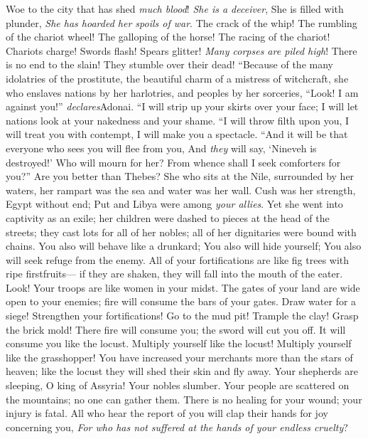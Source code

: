 \begin{biblechapter} %
 Woe to the city that has shed \textit{much blood}! 
\textit{She is a deceiver}, 
She is filled with plunder, 
\textit{She has hoarded her spoils of war}.
\verse The crack of the whip! 
The rumbling of the chariot wheel! 
The galloping of the horse! 
The racing of the chariot!
\verse Chariots charge! 
Swords flash! 
Spears glitter! 
\textit{Many corpses are piled high}! 
There is no end to the slain! 
They stumble over their dead!
 “Because of the many idolatries of the prostitute, 
the beautiful charm of a mistress of witchcraft, 
she who enslaves nations by her harlotries, 
and peoples by her sorceries,
\verse “Look! I am against you!” \textit{declares}Adonai. 
“I will strip up your skirts over your face; 
I will let nations look at your nakedness and your shame.
\verse “I will throw filth upon you, 
I will treat you with contempt, 
I will make you a spectacle.
\verse “And it will be that everyone who sees you will flee from you, 
And \textit{they} will say, ‘Nineveh is destroyed!’ 
Who will mourn for her? 
From whence shall I seek comforters for you?”
 Are you better than Thebes? 
She who sits at the Nile, surrounded by her waters, 
her rampart was the sea and water was her wall.
\verse Cush was her strength, Egypt without end; 
Put and Libya were among \textit{your allies}.
\verse Yet she went into captivity as an exile; 
her children were dashed to pieces at the head of the streets; 
they cast lots for all of her nobles; 
all of her dignitaries were bound with chains.
\verse You also will behave like a drunkard; 
You also will hide yourself; 
You also will seek refuge from the enemy.
 All of your fortifications are like fig trees with ripe firstfruits— 
if they are shaken, they will fall into the mouth of the eater.
\verse Look! Your troops are like women in your midst. 
The gates of your land are wide open to your enemies; 
fire will consume the bars of your gates.
\verse Draw water for a siege! 
Strengthen your fortifications! 
Go to the mud pit! 
Trample the clay! 
Grasp the brick mold!
\verse There fire will consume you; 
the sword will cut you off. 
It will consume you like the locust.
 Multiply yourself like the locust! 
Multiply yourself like the grasshopper!
\verse You have increased your merchants more than the stars of heaven; 
like the locust they will shed their skin and fly away.
 Your shepherds are sleeping, O king of Assyria! 
Your nobles slumber. 
Your people are scattered on the mountains; 
no one can gather them.
\verse There is no healing for your wound; 
your injury is fatal. 
All who hear the report of you will clap their hands for joy concerning you, 
\textit{For who has not suffered at the hands of your endless cruelty}?
\end{biblechapter}


